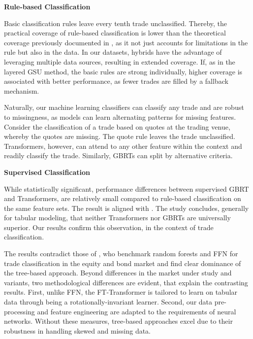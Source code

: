 \textbf{Rule-based Classification}

Basic classification rules leave every tenth trade unclassified. Thereby, the practical coverage of rule-based classification is lower than the theoretical coverage previously documented in \textcite[][40--42]{grauerOptionTradeClassification2022}, as it not just accounts for limitations in the rule but also in the data. In our datasets, hybrids have the advantage of leveraging multiple data sources, resulting in extended coverage. If, as in the layered \gls{GSU} method, the basic rules are strong individually, higher coverage is associated with better performance, as fewer trades are filled by a fallback mechanism. 

Naturally, our machine learning classifiers can classify any trade and are robust to missingness, as models can learn alternating patterns for missing features. Consider the classification of a trade based on quotes at the trading venue, whereby the quotes are missing. The quote rule leaves the trade unclassified. Transformers, however, can attend to any other feature within the context and readily classify the trade. Similarly, \glspl{GBRT} can split by alternative criteria.


\textbf{Supervised Classification}

While statistically significant, performance differences between supervised \gls{GBRT} and Transformers, are relatively small compared to rule-based classification on the same feature sets. The result is aligned with \textcite[][18941]{gorishniyRevisitingDeepLearning2021}. The study concludes, generally for tabular modeling, that neither Transformers nor \glspl{GBRT} are universally superior. Our results confirm this observation, in the context of trade classification.

The results contradict those of \textcite[][14--49]{ronenMachineLearningTrade2022}, who benchmark random forests and \gls{FFN} for trade classification in the equity and bond market and find clear dominance of the tree-based approach. Beyond differences in the market under study and variants, two methodological differences are evident, that explain the contrasting results. First, unlike \gls{FFN}, the FT-Transformer is tailored to learn on tabular data through being a rotationally-invariant learner. Second, our data pre-processing and feature engineering are adapted to the requirements of neural networks. Without these measures, tree-based approaches excel due to their robustness in handling skewed and missing data.

